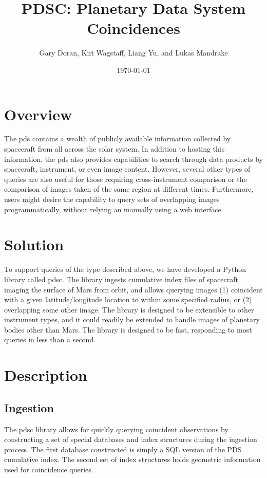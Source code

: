 \documentclass[twocolumn]{extarticle}
\title{
  PDSC: Planetary Data System Coincidences
}
\author{Gary Doran, Kiri Wagstaff, Liang Yu, and Lukas Mandrake}
\date{\today}
\begin{document}
\maketitle

\section*{Overview}
The \ac{pds} contains a wealth of publicly available information collected by
spacecraft from all across the solar system. In addition to hosting this
information, the \ac{pds} also provides capabilities to search through data
products by spacecraft, instrument, or even image content. However, several
other types of queries are also useful for those requiring cross-instrument
comparison or the comparison of images taken of the same region at different
times. Furthermore, users might desire the capability to query sets of
overlapping images programmatically, without relying an manually using a web
interface.

\section*{Solution}
To support queries of the type described above, we have developed a Python
library called \ac{pdsc}. The library ingests cumulative index files of
spacecraft imaging the surface of Mars from orbit, and allows querying images
(1) coincident with a given latitude/longitude location to within some
specified radius, or (2) overlapping some other image. The library is designed
to be extensible to other instrument types, and it could readily be extended to
handle images of planetary bodies other than Mars. The library is designed to
be fast, responding to most queries in less than a second.

\section*{Description}

\subsection*{Ingestion}
The \ac{pdsc} library allows for quickly querying coincident observations by
constructing a set of special databases and index structures during the
ingestion process. The first database constructed is simply a SQL version of the
PDS cumulative index. The second set of index structures holds geometric
information used for coincidence queries.
\end{document}
